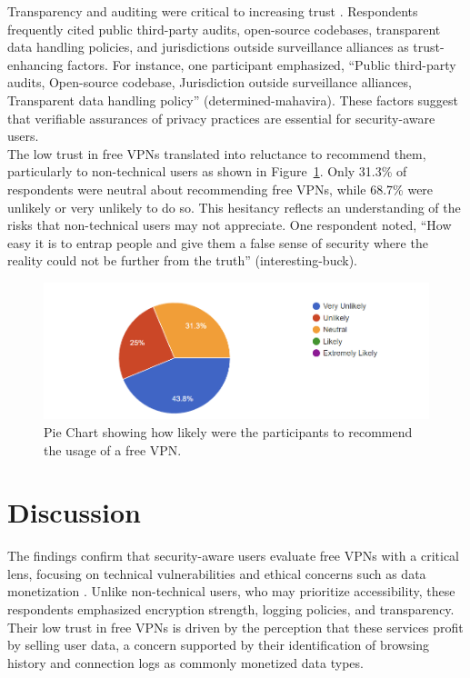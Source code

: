 \documentclass[11pt,a4paper]{article}
\begin{document}
Transparency and auditing were critical to increasing trust \cite{ramesh2023}. Respondents frequently cited public third-party audits, open-source codebases, transparent data handling policies, and jurisdictions outside surveillance alliances as trust-enhancing factors. For instance, one participant emphasized, ``Public third-party audits, Open-source codebase, Jurisdiction outside surveillance alliances, Transparent data handling policy'' (determined-mahavira). These factors suggest that verifiable assurances of privacy practices are essential for security-aware users.\\

The low trust in free VPNs translated into reluctance to recommend them, particularly to non-technical users as shown in Figure~\ref{Fig 2: Likely to Recommend}. Only 31.3\% of respondents were neutral about recommending free VPNs, while 68.7\% were unlikely or very unlikely to do so. This hesitancy reflects an understanding of the risks that non-technical users may not appreciate. One respondent noted, ``How easy it is to entrap people and give them a false sense of security where the reality could not be further from the truth'' (interesting-buck).

\begin{figure}[h]
    \centering
    \includegraphics[width=1.0\textwidth]{fig 2.png} 
    \caption{Pie Chart showing how likely were the participants to recommend the usage of a free VPN.}
    \label{Fig 2: Likely to Recommend}
\end{figure}


\section{Discussion}

The findings confirm that security-aware users evaluate free VPNs with a critical lens, focusing on technical vulnerabilities and ethical concerns such as data monetization \cite{alshalan2016,mehrnezhad2022}. Unlike non-technical users, who may prioritize accessibility, these respondents emphasized encryption strength, logging policies, and transparency. Their low trust in free VPNs is driven by the perception that these services profit by selling user data, a concern supported by their identification of browsing history and connection logs as commonly monetized data types. \\
\end{document}
